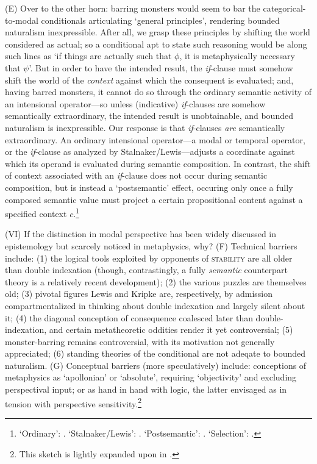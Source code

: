 \documentclass[12pt]{article}
\begin{document}
(E) Over to the other horn: barring monsters would seem to bar the
categorical-to-modal conditionals articulating `general principles', rendering
bounded naturalism inexpressible. After all, we grasp these principles by
shifting the world considered as actual; so a conditional apt to state such
reasoning would be along such lines as `if things are actually such that
$\phi$, it is metaphysically necessary that $\psi$'. But in order to have the
intended result, the \emph{if}-clause must somehow shift the world of the
\emph{context} against which the consequent is evaluated; and, having barred
monsters, it cannot do so through the ordinary semantic activity of an
intensional operator---so unless (indicative) \emph{if}-clauses are somehow
semantically extraordinary, the intended result is unobtainable, and bounded
naturalism is inexpressible.  Our response is that \emph{if}-clauses
\emph{are} semantically extraordinary. An ordinary intensional operator---a
modal or temporal operator, or the \emph{if}-clause as analyzed by
Stalnaker/Lewis---adjusts a coordinate against which its operand is evaluated
during semantic composition. In contrast, the shift of context associated with
an \emph{if}-clause does not occur during semantic composition, but is instead
a `postsemantic' effect, occuring only once a fully composed semantic value
must project a certain propositional content against a specified context
$c$.\footnote{`Ordinary': \citep[pp.~27--31]{lewis80icc}. `Stalnaker/Lewis':
\citep{stalnakeratoc,lewis73}. `Postsemantic': \citep{macfarlane14}.
`Selection': \citep{stalnakeratoc,Cariani2018-CARWDB-6}.}
 
\smallskip{}

(VI) If the distinction in modal perspective has been widely discussed in
epistemology but scarcely noticed in metaphysics, why? (F) Technical barriers
include: (1) the logical tools exploited by opponents of \textsc{stability}
are all older than double indexation (though, contrastingly, a fully
\emph{semantic} counterpart theory is a relatively recent development); (2)
the various puzzles are themselves old; (3) pivotal figures Lewis and Kripke
are, respectively, by admission compartmentalized in thinking about double
indexation and largely silent about it; (4) the diagonal conception of
consequence coalesced later than double-indexation, and certain metatheoretic
oddities render it yet controversial; (5) monster-barring remains
controversial, with its motivation not generally appreciated; (6) standing
theories of the conditional are not adeqate to bounded naturalism. (G)
Conceptual barriers (more speculatively) include: conceptions of metaphysics
as `apollonian' or `absolute', requiring `objectivity' and excluding
perspectival input; or as hand in hand with logic, the latter envisaged as in
tension with perspective sensitivity.\footnote{This sketch is lightly expanded
upon in \citep[sec.~5]{hmw}.}


\eject




%
%
\end{document}
